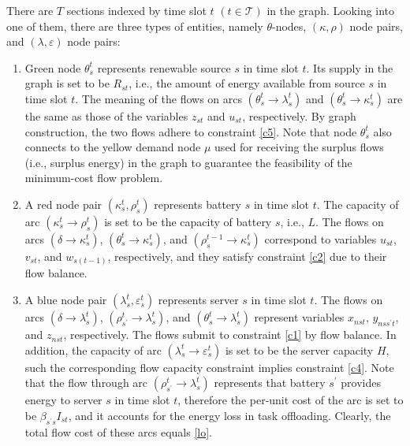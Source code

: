 \documentclass[conference, 10pt, ﬁnal, letterpaper, twocolumn]{IEEEtran}
\begin{document}
There are $T$ sections indexed by time slot $t$ $(t\in \mathcal{T})$ in the graph. Looking into one of them, there are three types of entities, namely $\theta$-nodes, $(\kappa, \rho)$ node pairs, and $(\lambda, \varepsilon)$ node pairs:
\begin{enumerate}
    \item Green node $\theta^{t}_{s}$ represents renewable source $s$ in time slot $t$. Its supply in the graph is set to be $R_{st}$, i.e., the amount of energy available from source $s$ in time slot $t$. The meaning of the flows on arcs $(\theta^{t}_{s}\rightarrow \lambda^{t}_{s})$ and $(\theta^{t}_{s}\rightarrow \kappa^{t}_{s})$ are the same as those of the variables $z_{st}$ and $u_{st}$, respectively. By graph construction, the two flows adhere to constraint \eqref{c5}. Note that node $\theta^{t}_{s}$ also connects to the yellow demand node $\mu$ used for receiving the surplus flows (i.e., surplus energy) in the graph to guarantee the feasibility of the minimum-cost flow problem.
    \item A red node pair $(\kappa^{t}_{s}, \rho^{t}_{s})$ represents battery $s$ in time slot $t$. The capacity of arc $(\kappa^{t}_{s}\rightarrow \rho^{t}_{s})$ is set to be the capacity of battery $s$, i.e., $L$. The flows on arcs $(\delta \rightarrow \kappa^{t}_{s})$, $(\theta^{t}_{s} \rightarrow \kappa^{t}_{s})$, and $(\rho^{t-1}_{s}\rightarrow \kappa^{t}_{s})$ correspond to variables $u_{st}$, $v_{st}$, and $w_{s(t-1)}$, respectively, and they satisfy constraint \eqref{c2} due to their flow balance.
    \item A blue node pair $(\lambda^{t}_{s}, \varepsilon^{t}_{s})$ represents server $s$ in time slot $t$. The flows on arcs $(\delta \rightarrow \lambda^{t}_{s})$, $(\rho^{t}_{s^\prime} \rightarrow \lambda^{t}_{s})$, and $(\theta^{t}_{s} \rightarrow \lambda^{t}_{s} )$ represent variables $x_{nst}$, $y_{nss^\prime t}$, and $z_{nst}$, respectively. The flows submit to constraint \eqref{c1} by flow balance. In addition, the capacity of arc $(\lambda^{t}_{s}\rightarrow\varepsilon^{t}_{s})$ is set to be the server capacity $H$, such the corresponding flow capacity constraint implies constraint \eqref{c4}. Note that the flow through arc $(\rho^{t}_{s^\prime}\rightarrow\lambda^{t}_{s})$ represents that battery $s^\prime$ provides energy to server $s$ in time slot $t$, therefore the per-unit cost of the arc is set to be $\beta_{s^\prime s} I_{st}$, and it accounts for the energy loss in task offloading. Clearly, the total flow cost of these arcs equals \eqref{lo}.
\end{enumerate}
\end{document}
